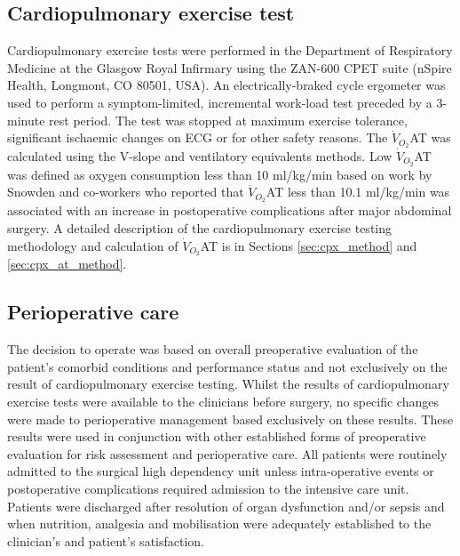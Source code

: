 \subsection{Cardiopulmonary exercise test}
Cardiopulmonary exercise tests were performed in the Department of Respiratory Medicine at the Glasgow Royal Infirmary using the ZAN-600 CPET suite (nSpire Health, Longmont, CO 80501, USA). 
An electrically-braked cycle ergometer was used to perform a symptom-limited, incremental work-load test preceded by a 3-minute rest period. 
The test was stopped at maximum exercise tolerance, significant ischaemic changes on ECG or for other safety reasons. 
The $\dot{V}_{O_2}$AT was calculated using the V-slope \parencite{beaver_new_1986, sue_metabolic_1988} and ventilatory equivalents \parencite{sue_metabolic_1988} methods. 
Low $\dot{V}_{O_2}$AT was defined as oxygen consumption less than 10 ml/kg/min based on work by Snowden and co-workers \parencite{snowden_submaximal_2010} who reported that $\dot{V}_{O_2}$AT less than 10.1 ml/kg/min was associated with an increase in postoperative complications after major abdominal surgery.
A detailed description of the cardiopulmonary exercise testing methodology and calculation of $\dot{V}_{O_2}$AT is in Sections \ref{sec:cpx_method} and \ref{sec:cpx_at_method}.

\subsection{Perioperative care}
The decision to operate was based on overall preoperative evaluation of the patient's comorbid conditions and performance status and not exclusively on the result of cardiopulmonary exercise testing. 
Whilst the results of cardiopulmonary exercise tests were available to the clinicians before surgery, no specific changes were made to perioperative management based exclusively on these results. 
These results were used in conjunction with other established forms of preoperative evaluation for risk assessment and perioperative care. 
All patients were routinely admitted to the surgical high dependency unit unless intra-operative events or postoperative complications required admission to the intensive care unit. 
Patients were discharged after resolution of organ dysfunction and/or sepsis and when nutrition, analgesia and mobilisation were adequately established to the clinician's and patient's satisfaction.

